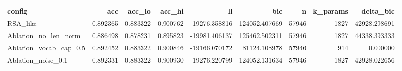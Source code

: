 \begin{tabular}{lrrrrrrrr}
\toprule
config & acc & acc\_lo & acc\_hi & ll & bic & n & k\_params & delta\_bic \\
\midrule
RSA\_like & 0.892365 & 0.883322 & 0.900762 & -19276.358816 & 124052.407669 & 57946 & 1827 & 42928.298691 \\
Ablation\_no\_len\_norm & 0.886498 & 0.878231 & 0.895823 & -19981.406137 & 125462.502311 & 57946 & 1827 & 44338.393333 \\
Ablation\_vocab\_cap\_0.5 & 0.892452 & 0.883322 & 0.900846 & -19166.070172 & 81124.108978 & 57946 & 914 & 0.000000 \\
Ablation\_noise\_0.1 & 0.892331 & 0.883322 & 0.900930 & -19276.220799 & 124052.131634 & 57946 & 1827 & 42928.022656 \\
\bottomrule
\end{tabular}

